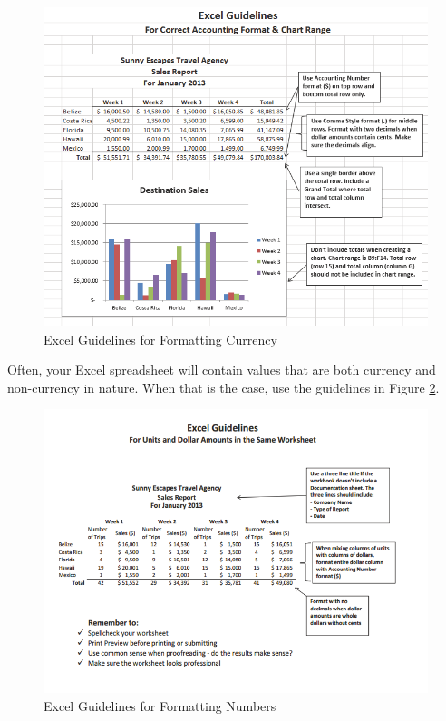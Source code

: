 \begin{figure}[H]
	\centering
	\includegraphics[width=\maxwidth{.95\linewidth}]{gfx/ch01_fig32}
	\caption{Excel Guidelines for Formatting Currency}
	\label{01:fig32}
\end{figure}

Often, your Excel spreadsheet will contain values that are both currency and non-currency in nature. When that is the case, use the guidelines in Figure \ref{01:fig33}.

\begin{figure}[H]
	\centering
	\includegraphics[width=\maxwidth{.95\linewidth}]{gfx/ch01_fig33}
	\caption{Excel Guidelines for Formatting Numbers}
	\label{01:fig33}
\end{figure}

